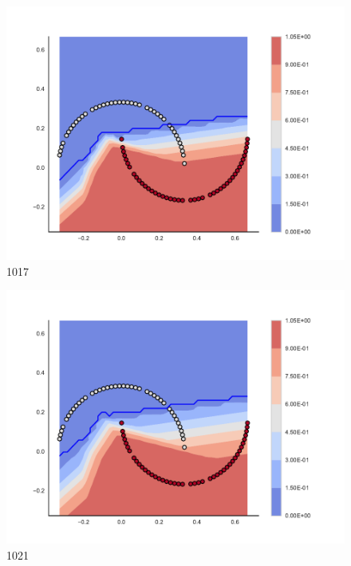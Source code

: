 \begin{subfigure}[b]{0.09\textwidth}
    \includegraphics[clip, trim=2.35cm 1.75cm 4.5cm 0cm,width=\textwidth]{img/convergence/1017.pdf}
    \caption{1017}
    \label{fig:convergence_1017}
\end{subfigure}
%
\begin{subfigure}[b]{0.09\textwidth}
    \includegraphics[clip, trim=2.35cm 1.75cm 4.5cm 0cm,width=\textwidth]{img/convergence/1021.pdf}
    \caption{1021}
    \label{fig:convergence_1021}
\end{subfigure}
%
